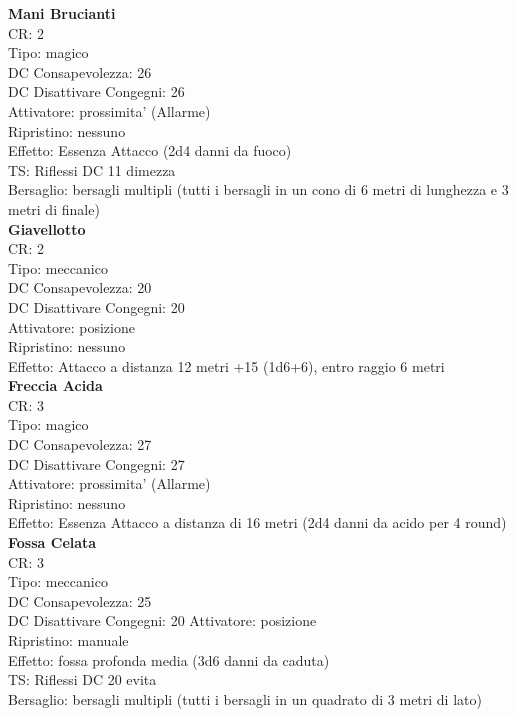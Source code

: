 \documentclass[a4paper,11pt,twoside,openany]{book}
\begin{document}
{\begin{multicols}{2}
			\textbf{Mani Brucianti}\\
			CR: 2 \\
			Tipo: magico \\
			DC Consapevolezza: 26 \\
			DC Disattivare Congegni: 26 \\
			Attivatore: prossimita' (Allarme) \\
			Ripristino: nessuno \\
			Effetto: Essenza Attacco (2d4 danni da fuoco) \\
			TS: Riflessi DC 11 dimezza \\
			Bersaglio: bersagli multipli (tutti i bersagli in un cono di 6 metri di lunghezza e 3 metri di finale)\\
			
			\textbf{Giavellotto}\\
			CR: 2 \\
			Tipo: meccanico \\
			DC Consapevolezza: 20 \\
			DC Disattivare Congegni: 20 \\
			Attivatore: posizione \\
			Ripristino: nessuno \\
			Effetto: Attacco a distanza 12 metri +15 (1d6+6), entro raggio 6 metri\\
			
			\textbf{Freccia Acida}\\
			CR: 3 \\
			Tipo: magico \\
			DC Consapevolezza: 27 \\
			DC Disattivare Congegni: 27 \\
			Attivatore: prossimita' (Allarme) \\
			Ripristino: nessuno \\
			Effetto: Essenza Attacco a distanza di 16 metri (2d4 danni da acido per 4 round)\\
			
			\textbf{Fossa Celata}\\
			CR: 3 \\
			Tipo: meccanico \\
			DC Consapevolezza: 25 \\
			DC Disattivare Congegni: 20 
			Attivatore: posizione \\
			Ripristino: manuale \\
			Effetto: fossa profonda media (3d6 danni da caduta) \\
			TS: Riflessi DC 20 evita \\
			Bersaglio: bersagli multipli (tutti i bersagli in un quadrato di 3 metri di lato)\\
			

\end{multicols}}
\end{document}
